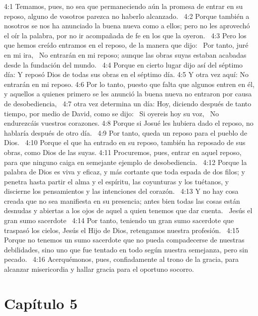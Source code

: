 4:1 Temamos, pues, no sea que permaneciendo aún la promesa de entrar en su reposo, alguno de vosotros parezca no haberlo alcanzado.  
4:2 Porque también a nosotros se nos ha anunciado la buena nueva como a ellos; pero no les aprovechó el oír la palabra, por no ir acompañada de fe en los que la oyeron.  
4:3 Pero los que hemos creído entramos en el reposo, de la manera que dijo:  
Por tanto, juré en mi ira,  
No entrarán en mi reposo; 
aunque las obras suyas estaban acabadas desde la fundación del mundo.  
4:4 Porque en cierto lugar dijo así del séptimo día: Y reposó Dios de todas sus obras en el séptimo día. 
4:5 Y otra vez aquí: No entrarán en mi reposo. 
4:6 Por lo tanto, puesto que falta que algunos entren en él, y aquellos a quienes primero se les anunció la buena nueva no entraron por causa de desobediencia,  
4:7 otra vez determina un día: Hoy, diciendo después de tanto tiempo, por medio de David, como se dijo:  
Si oyereis hoy su voz,  
No endurezcáis vuestros corazones. 
4:8 Porque si Josué les hubiera dado el reposo, no hablaría después de otro día.  
4:9 Por tanto, queda un reposo para el pueblo de Dios.  
4:10 Porque el que ha entrado en su reposo, también ha reposado de sus obras, como Dios de las suyas. 
4:11 Procuremos, pues, entrar en aquel reposo, para que ninguno caiga en semejante ejemplo de desobediencia.  
4:12 Porque la palabra de Dios es viva y eficaz, y más cortante que toda espada de dos filos; y penetra hasta partir el alma y el espíritu, las coyunturas y los tuétanos, y discierne los pensamientos y las intenciones del corazón.  
4:13 Y no hay cosa creada que no sea manifiesta en su presencia; antes bien todas las cosas están desnudas y abiertas a los ojos de aquel a quien tenemos que dar cuenta.  
Jesús el gran sumo sacerdote  
4:14 Por tanto, teniendo un gran sumo sacerdote que traspasó los cielos, Jesús el Hijo de Dios, retengamos nuestra profesión.  
4:15 Porque no tenemos un sumo sacerdote que no pueda compadecerse de nuestras debilidades, sino uno que fue tentado en todo según nuestra semejanza, pero sin pecado.  
4:16 Acerquémonos, pues, confiadamente al trono de la gracia, para alcanzar misericordia y hallar gracia para el oportuno socorro.  
\section*{Capítulo 5 }

